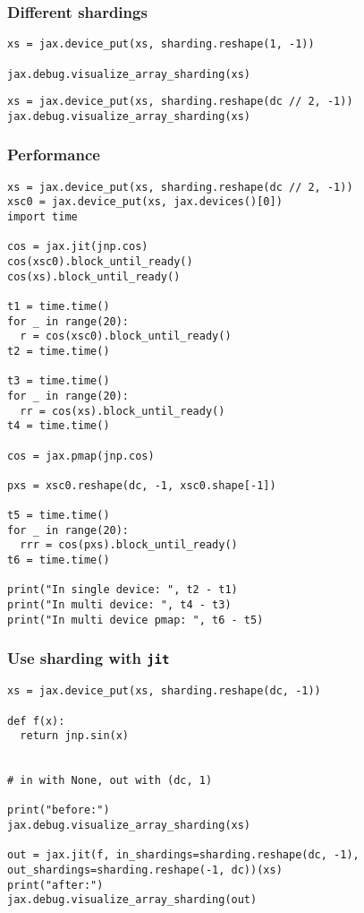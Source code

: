 \documentclass[11pt]{article}
\begin{document}
\subsubsection{Different shardings}
\label{sec:orgb51b3f0}

\begin{verbatim}
xs = jax.device_put(xs, sharding.reshape(1, -1))

jax.debug.visualize_array_sharding(xs)
\end{verbatim}

\begin{verbatim}
xs = jax.device_put(xs, sharding.reshape(dc // 2, -1))
jax.debug.visualize_array_sharding(xs)
\end{verbatim}
\subsubsection{Performance}
\label{sec:org2471f3d}

\begin{verbatim}
xs = jax.device_put(xs, sharding.reshape(dc // 2, -1))
xsc0 = jax.device_put(xs, jax.devices()[0])
import time

cos = jax.jit(jnp.cos)
cos(xsc0).block_until_ready()
cos(xs).block_until_ready()

t1 = time.time()
for _ in range(20):
  r = cos(xsc0).block_until_ready()
t2 = time.time()

t3 = time.time()
for _ in range(20):
  rr = cos(xs).block_until_ready()
t4 = time.time()

cos = jax.pmap(jnp.cos)

pxs = xsc0.reshape(dc, -1, xsc0.shape[-1])

t5 = time.time()
for _ in range(20):
  rrr = cos(pxs).block_until_ready()
t6 = time.time()

print("In single device: ", t2 - t1)
print("In multi device: ", t4 - t3)
print("In multi device pmap: ", t6 - t5)
\end{verbatim}
\subsubsection{Use sharding with \texttt{jit}}
\label{sec:orgee20554}

\begin{verbatim}
xs = jax.device_put(xs, sharding.reshape(dc, -1))

def f(x):
  return jnp.sin(x)


# in with None, out with (dc, 1)

print("before:")
jax.debug.visualize_array_sharding(xs)

out = jax.jit(f, in_shardings=sharding.reshape(dc, -1), out_shardings=sharding.reshape(-1, dc))(xs)
print("after:")
jax.debug.visualize_array_sharding(out)
\end{verbatim}
\end{document}
